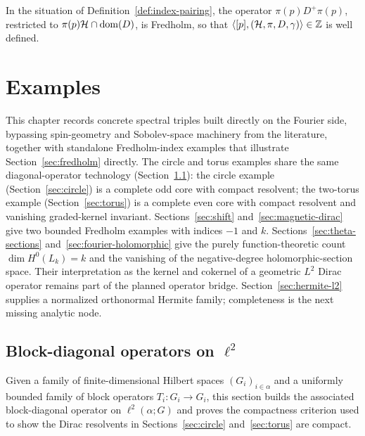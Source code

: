 \begin{theorem}
  \label{thm:index-pairing-well-defined}
  In the situation of Definition~\ref{def:index-pairing}, the operator
  $\pi(p) D^{+} \pi(p)$, restricted to $\pi(p)\mathcal{H} \cap \operatorname{dom}(D)$, is Fredholm, so that
  $\langle [p], (\mathcal{H}, \pi, D, \gamma) \rangle \in \mathbb{Z}$ is well defined.
\end{theorem}

\chapter{Examples}
\label{cha:examples}

This chapter records concrete spectral triples built directly on the Fourier side, bypassing
spin-geometry and Sobolev-space machinery from the literature, together with standalone
Fredholm-index examples that illustrate Section~\ref{sec:fredholm} directly. The circle and
torus examples share the same diagonal-operator technology (Section~\ref{sec:diagonal-operators}):
the circle example (Section~\ref{sec:circle}) is a complete odd core with compact resolvent;
the two-torus example (Section~\ref{sec:torus}) is a complete even core with compact resolvent
and vanishing graded-kernel invariant. Sections~\ref{sec:shift} and~\ref{sec:magnetic-dirac}
give two bounded Fredholm examples with indices $-1$ and $k$. Sections~\ref{sec:theta-sections}
and~\ref{sec:fourier-holomorphic} give the purely function-theoretic count
$\dim H^0(L_k)=k$ and the vanishing of the negative-degree holomorphic-section space.  Their
interpretation as the kernel and cokernel of a geometric $L^2$ Dirac operator remains part of
the planned operator bridge. Section~\ref{sec:hermite-l2} supplies a normalized orthonormal
Hermite family; completeness is the next missing analytic node.

\section{Block-diagonal operators on \texorpdfstring{$\ell^2$}{l2}}
\label{sec:diagonal-operators}

Given a family of finite-dimensional Hilbert spaces $(G_i)_{i \in \alpha}$ and a uniformly
bounded family of block operators $T_i \colon G_i \to G_i$, this section builds the
associated block-diagonal operator on $\ell^2(\alpha; G)$ and proves the compactness
criterion used to show the Dirac resolvents in Sections~\ref{sec:circle}
and~\ref{sec:torus} are compact.

